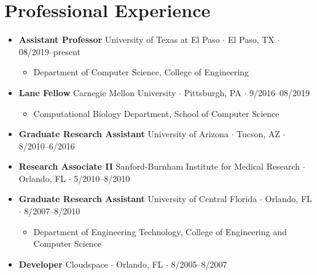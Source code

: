 \documentclass[10pt,letterpaper]{article}
\newcommand{\bigdot}{$\cdot$\xspace}
\begin{document}
\section*{Professional Experience}
\begin{itemize}[leftmargin=*,labelindent=5pt,itemindent=-15pt]
\item \textbf{Assistant Professor}
University of Texas at El Paso \bigdot El Paso, TX \bigdot 08/2019--present
\begin{itemize}
	\item Department of Computer Science, College of Engineering
\end{itemize}


\item \textbf{Lane Fellow}
Carnegie Mellon University \bigdot Pittsburgh, PA \bigdot 9/2016--08/2019
\begin{itemize}
    \item Computational Biology Department, School of Computer Science
\end{itemize}

\item \textbf{Graduate Research Assistant}
University of Arizona \bigdot Tucson, AZ \bigdot 8/2010--6/2016 

\item \textbf{Research Associate II}
Sanford-Burnham Institute for Medical Research \bigdot Orlando, FL \bigdot 5/2010--8/2010 

\item \textbf{Graduate Research Assistant}
University of Central Florida \bigdot Orlando, FL \bigdot 8/2007--8/2010 
\begin{itemize}
    \item Department of Engineering Technology, College of Engineering and Computer Science
\end{itemize}

\item \textbf{Developer}
Cloudspace \bigdot Orlando, FL \bigdot 8/2005--8/2007 
\end{itemize}
\end{document}

